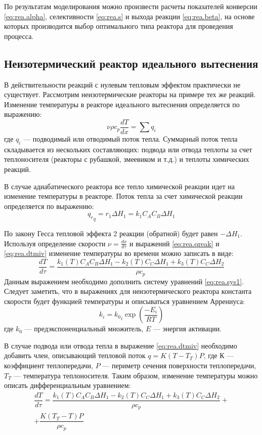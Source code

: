 По результатам моделирования можно произвести расчеты показателей конверсии \eqref{eq:rea.alpha}, селективности \eqref{eq:rea.s} и выхода реакции \eqref{eq:rea.beta}, на основе которых производится выбор оптимального типа реактора для проведения процесса. 

\subsection*{Неизотермический реактор идеального вытеснения}
В действительности реакций с нулевым тепловым эффектом практически не существует. Рассмотрим неизотермические реакторы на примере тех же реакций.
Изменение температуры в реакторе идеального вытеснения определяется по выражению:
\begin{equation}\label{eq:rea.dtmiv}
	\nu \rho c_p \dfrac{d T}{d x} = \sum q_i
\end{equation}
где $q_i$ --- подводимый или отводимый поток тепла. Суммарный поток тепла складывается из нескольких составляющих: подвода или отвода теплоты за счет теплоносителя (реакторы с рубашкой, змеевиком и т.д.) и теплоты химических реакций. 

В случае адиабатического реактора все тепло химической реакции идет на изменение температуры в реакторе. Поток тепла за счет химической реакции определяется по выражению:
\begin{equation} \label{eq:rea.qreak}
	{q_r}_q=r_1 \Delta H_1 = k_1 C_A C_B \Delta H_1
\end{equation}

По закону Гесса тепловой эффекта 2 реакции (обратной) будет равен $-\Delta H_1$. Используя определение скорости $\nu=\frac{d x }{d \tau}$ и выражений \eqref{eq:rea.qreak} и \eqref{eq:rea.dtmiv} изменение температуры во времени можно записать в виде:
\begin{equation}\label{eq:rea.dtmiv1}
	\dfrac{d T}{d \tau}= \dfrac {k_1(T) C_A C_B \Delta H_1 -k_2(T) C_C \Delta H_1 +k_3(T) C_C \Delta H_2}{\rho c_p} 
\end{equation}
Данным выражением необходимо дополнить систему уравнений \ref{eq:rea.sys1}. Следует заметить, что в выражениях для  неизотермического реактора константа скорости будет функцией температуры и описываться уравнением Аррениуса:
\begin{equation}
	k_i={k_0}_i \exp \left( \dfrac{-E_i}{RT}\right)
\end{equation}
где $k_0$ --- предэкспоненциальный множитель,  $E$ --- энергия активации.

В случае подвода или отвода тепла в выражение \eqref{eq:rea.dtmiv} необходимо добавить член, описывающий тепловой поток $q=K(T-T_T)P$, где $К$ --- коэффициент теплопередачи, $P$ --- периметр сечения поверхности теплопередачи, $T_T$ --- температура теплоносителя. Таким образом, изменение температуры можно описать дифференциальным уравнением:
\begin{eqnarray}\label{eq:rea.dtmiv2}
\dfrac{d T}{d \tau}= \dfrac {k_1(T) C_A C_B \Delta H_1 -k_2(T) C_C \Delta H_1 +k_3(T) C_C \Delta H_2}{\rho c_p} + \nonumber \\ + \dfrac{K(T_T-T)P}{\rho c_p} \quad
\end{eqnarray}

